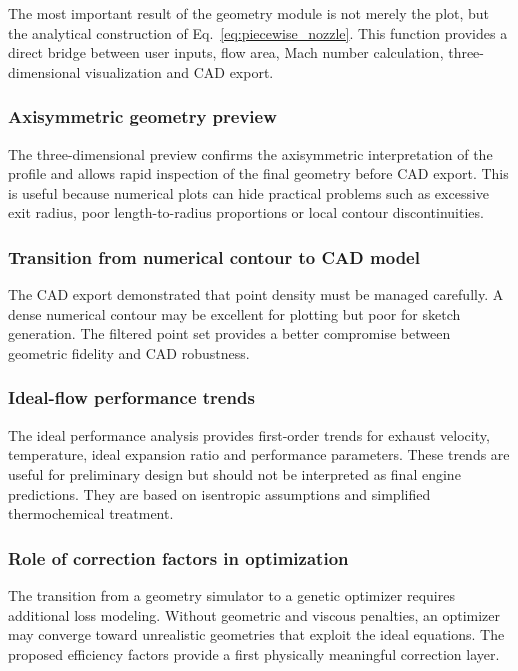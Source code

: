\documentclass[11pt,a4paper]{article}
\begin{document}
The most important result of the geometry module is not merely the plot, but the analytical construction of Eq.~\eqref{eq:piecewise_nozzle}. This function provides a direct bridge between user inputs, flow area, Mach number calculation, three-dimensional visualization and CAD export.

\subsubsection{Axisymmetric geometry preview}

The three-dimensional preview confirms the axisymmetric interpretation of the profile and allows rapid inspection of the final geometry before CAD export. This is useful because numerical plots can hide practical problems such as excessive exit radius, poor length-to-radius proportions or local contour discontinuities.

\subsubsection{Transition from numerical contour to CAD model}

The CAD export demonstrated that point density must be managed carefully. A dense numerical contour may be excellent for plotting but poor for sketch generation. The filtered point set provides a better compromise between geometric fidelity and CAD robustness.

\subsubsection{Ideal-flow performance trends}

The ideal performance analysis provides first-order trends for exhaust velocity, temperature, ideal expansion ratio and performance parameters. These trends are useful for preliminary design but should not be interpreted as final engine predictions. They are based on isentropic assumptions and simplified thermochemical treatment.

\subsubsection{Role of correction factors in optimization}

The transition from a geometry simulator to a genetic optimizer requires additional loss modeling. Without geometric and viscous penalties, an optimizer may converge toward unrealistic geometries that exploit the ideal equations. The proposed efficiency factors provide a first physically meaningful correction layer.
\end{document}
